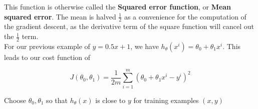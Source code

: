 This function is otherwise called the \textbf{Squared error function}, or \textbf{Mean squared error}. The mean is halved $\frac{1}{2}$ as a convenience for the computation of the gradient descent, as the derivative term of the square function will cancel out the $\frac{1}{2}$ term. \\

For our previous example of $y=0.5x + 1$, we have $h_{\theta}(x^{i}) = \theta_{0} + \theta_{1}x^{i}$.  This leads to our cost function of 

\begin{equation}
J(\theta_{0}, \theta_{1}) = \frac{1}{2m} \sum_{i=1}^{m} (\theta_{0} + \theta_{1}x^{i} - y^{i})^{2} 
\end{equation}

Choose $\theta_{0}, \theta_{1}$ so that $h_{\theta}(x)$ is close to $y$ for training examples $(x,y)$\\
